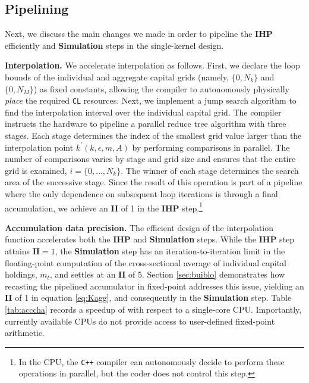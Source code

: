 \documentclass[12pt,american]{article}
\newcommand{\kopt}{k^{\prime}}
\newcommand{\state}{k,\epsilon,m,A}
\newcommand{\resultsfolder}{./results}
\newcommand{\devfpgaI}{fpgaI}
\newcommand{\nKMIkI}{nKM4-nk100}
\newcommand{\knlI}{knl-1}
\newcommand{\fpgaIpipspeedcpuIbasenKMIkI}{}
\newcommand{\baselineII}{5}
\begin{document}
\subsection{Pipelining}\label{sec:pip}

Next, we discuss the main changes we made in order to pipeline the \textbf{IHP} efficiently and \textbf{Simulation} steps in the single-kernel design.

\textbf{Interpolation.}\label{sec:interp} 
We accelerate interpolation as follows. First, we declare the loop bounds of the individual and aggregate capital grids (namely, $\{0,N_{k}\}$ and $\{0,N_{M}\}$) as fixed constants, allowing the compiler to autonomously physically \textit{place} the required \texttt{CL} resources. Next, we implement a jump search algorithm to find the interpolation interval over the individual capital grid. The compiler instructs the hardware to pipeline a parallel reduce tree algorithm with three stages. Each stage determines the index of the smallest grid value larger than the interpolation point $\kopt(\state)$ by performing comparisons in parallel. The number of comparisons varies by stage and grid size and ensures that the entire grid is examined, $i=\{0,\ldots,N_{k}\}$. The winner of each stage determines the search area of the successive stage. Since the result of this operation is part of a pipeline where the only dependence on subsequent loop iterations is through a final accumulation, we achieve an \textbf{II} of 1 in the \textbf{IHP} step.\footnote{In the CPU, the \texttt{C++} compiler can autonomously decide to perform these operations in parallel, but the coder does not control this step.}

\textbf{Accumulation data precision.}\label{sec:datpre} The efficient design of the interpolation function accelerates both the \textbf{IHP} and \textbf{Simulation} steps. While the \textbf{IHP} step attains $\textbf{II}=1$, the \textbf{Simulation} step has an iteration-to-iteration limit in the floating-point computation of the cross-sectional average of individual capital holdings, $m_{t}$, and settles at an $\textbf{II}$ of \baselineII. Section \ref{sec:buiblo} demonstrates how recasting the pipelined accumulator in fixed-point addresses this issue, yielding an \textbf{II} of 1 in equation \eqref{eq:Kagg}, and consequently in the \textbf{Simulation} step. Table \ref{tab:acccha} records a speedup of \fpgaIpipspeedcpuIbasenKMIkI with respect to a single-core CPU. Importantly, currently available CPUs do not provide access to user-defined fixed-point arithmetic.
\end{document}
